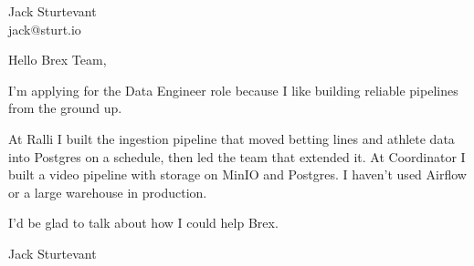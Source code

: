 \documentclass[11pt]{article}
\begin{document}
\raggedright

{\namefont\fontsize{20pt}{24pt}\selectfont Jack Sturtevant}\\[-0.3em]
jack@sturt.io

\vspace{1.2em}

Hello Brex Team,

I'm applying for the Data Engineer role because I like building reliable pipelines from the ground up.

At Ralli I built the ingestion pipeline that moved betting lines and athlete data into Postgres on a schedule, then led the team that extended it. At Coordinator I built a video pipeline with storage on MinIO and Postgres. I haven't used Airflow or a large warehouse in production.

I'd be glad to talk about how I could help Brex.

\vspace{0.6em}
Jack Sturtevant
\end{document}
